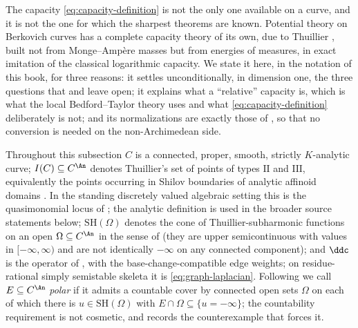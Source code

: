The capacity \eqref{eq:capacity-definition} is not the only one available on
a curve, and it is not the one for which the sharpest theorems are known.
Potential theory on Berkovich curves has a complete capacity theory of its
own, due to Thuillier \cite{Thu05}, built not from Monge--Amp\`ere masses but
from energies of measures, in exact imitation of the classical logarithmic
capacity.  We state it here, in the notation of this book, for three
reasons: it settles unconditionally, in dimension one, the three questions
that  and
 leave open; it explains what a
``relative'' capacity is, which is what the local Bedford--Taylor theory
uses and what \eqref{eq:capacity-definition} deliberately is not; and its
normalizations are exactly those of , so that no
conversion is needed on the non-Archimedean side.

Throughout this subsection $C$ is a connected, proper, smooth, strictly
$K$-analytic curve; $I(C)\subseteq C^{\An}$ denotes Thuillier's set of points of types
$\mathrm{II}$ and $\mathrm{III}$, equivalently the points occurring in
Shilov boundaries of analytic affinoid domains
\cite[\S3.2]{Thu05}.  In the standing discretely valued algebraic
setting this is the quasimonomial locus of
; the analytic definition is used
in the broader source statements below; $\mathrm{SH}(\Omega)$ denotes the
cone of Thuillier-subharmonic functions on an open $\Omega\subseteq C^{\An}$
in the sense of  (they are upper semicontinuous with
values in $[-\infty,\infty)$ and are not identically $-\infty$ on any
connected component); and $\ddc$ is the operator of
, with the base-change-compatible edge weights;
on residue-rational simply semistable skeleta it is
\eqref{eq:graph-laplacian}.  Following \cite{Thu05} we call
$E\subseteq C^{\An}$ \emph{polar} if it admits a countable cover by
connected open sets $\Omega$ on each of which there is
$u\in\mathrm{SH}(\Omega)$ with $E\cap\Omega\subseteq\{u=-\infty\}$; the
countability requirement is not cosmetic, and
 records the counterexample that forces it.

